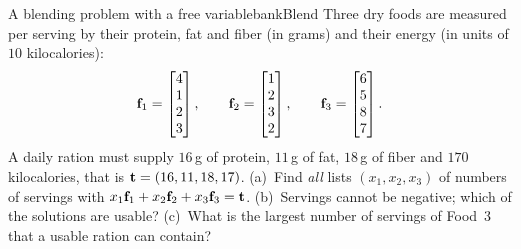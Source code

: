 \documentclass[11pt]{article}
\begin{document}
\begin{exmp}{A blending problem with a free variable}{bankBlend}
Three dry foods are measured per serving by their protein, fat and fiber (in grams) and their energy (in units of $10$ kilocalories):
\[
\mathbf{f}_1=\begin{bmatrix}4\\1\\2\\3\end{bmatrix},\qquad
\mathbf{f}_2=\begin{bmatrix}1\\2\\3\\2\end{bmatrix},\qquad
\mathbf{f}_3=\begin{bmatrix}6\\5\\8\\7\end{bmatrix}.
\]
A daily ration must supply $16$\,g of protein, $11$\,g of fat, $18$\,g of fiber and $170$ kilocalories, that is $\mathbf{t}=(16,11,18,17)$. (a)~Find \emph{all} lists $(x_1,x_2,x_3)$ of numbers of servings with $x_1\mathbf{f}_1+x_2\mathbf{f}_2+x_3\mathbf{f}_3=\mathbf{t}$. (b)~Servings cannot be negative; which of the solutions are usable? (c)~What is the largest number of servings of Food~3 that a usable ration can contain?


\end{exmp}
\end{document}
